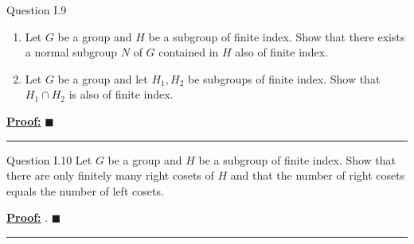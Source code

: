 \documentclass{article}
\newenvironment{proof}[1][Proof]{\par
\vspace{2mm}\noindent\textbf{\underline{#1:} }\rmfamily}{\hfill $\blacksquare$\par\vspace{2mm}}
\begin{document}
\begin{mathdefinitionbox}{Question I.9}
\vskip 0.5cm

\begin{enumerate}[label=(\alph*)]
  \item 
  Let $G$ be a group and $H$ be a subgroup of finite index. Show that there exists a normal subgroup $N$ of $G$ contained in $H$ also of finite index.
  \item Let $G$ be a group and let $H_1, H_2$ be subgroups of finite index. Show that $H_1 \cap H_2$ is also of finite index.
\end{enumerate}
\end{mathdefinitionbox}

\vskip 0.5cm
\begin{proof}
\end{proof}

\vskip 0.5cm
\hrule 
\vskip 0.5cm



\begin{mathdefinitionbox}{Question I.10}
\vskip 0.5cm
Let $G$ be a group and $H$ be a subgroup of finite index. Show that there are only finitely many right cosets of $H$ and that the number of right cosets equals the number of left cosets.
\end{mathdefinitionbox}

\vskip 0.5cm
\begin{proof}
  .
\end{proof}

\vskip 0.5cm
\hrule 
\vskip 0.5cm








  

\end{document}
